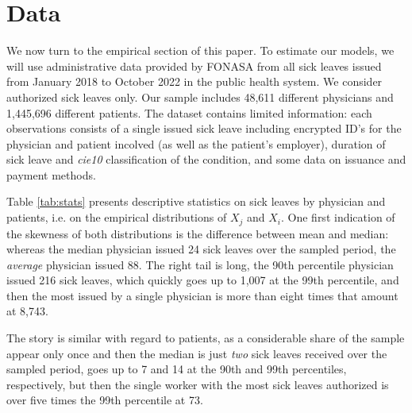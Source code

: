 \documentclass[../main.tex]{subfiles}
\begin{document}
\section{Data}

We now turn to the empirical section of this paper. To estimate our models, we will use administrative data provided by FONASA from all sick leaves issued from January 2018 to October 2022 in the public health system. We consider authorized sick leaves only. Our sample includes 48,611 different physicians and 1,445,696 different patients. The dataset contains limited information: each observations consists of a single issued sick leave including encrypted ID's for the physician and patient incolved (as well as the patient's employer), duration of sick leave and \textit{cie10} classification of the condition, and some data on issuance and payment methods.

Table \ref{tab:stats} presents descriptive statistics on sick leaves by physician and patients, i.e. on the empirical distributions of $X_j$ and $X_i$. One first indication of the skewness of both distributions is the difference between mean and median: whereas the median physician issued 24 sick leaves over the sampled period, the \textit{average} physician issued 88. The right tail is long, the 90th percentile physician issued 216 sick leaves, which quickly goes up to 1,007 at the 99th percentile, and then the most issued by a single physician is more than eight times that amount at 8,743.

The story is similar with regard to patients, as a considerable share of the sample appear only once and then the median is just \textit{two} sick leaves received over the sampled period, goes up to 7 and 14 at the 90th and 99th percentiles, respectively, but then the single worker with the most sick leaves authorized is over five times the 99th percentile at 73.
\end{document}
